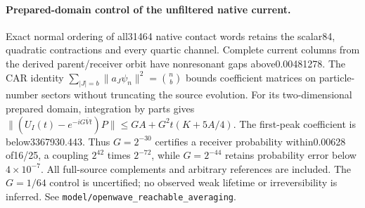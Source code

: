 \paragraph{Prepared-domain control of the unfiltered native current.}
Exact normal ordering of all31464 native contact words retains the scalar84,
quadratic contractions and every quartic channel. Complete current columns
from the derived parent/receiver orbit have nonresonant gaps above0.00481278.
The CAR identity
$\sum_{|J|=b}\|a_J\psi_n\|^2=\binom nb$ bounds coefficient matrices on
particle-number sectors without truncating the source evolution.
For its two-dimensional prepared domain, integration by parts gives
$\|(U_I(t)-e^{-iG\overline Vt})P\|\leq GA+G^2t(K+5A/4)$.
The first-peak coefficient is below3367930.443. Thus $G=2^{-30}$ certifies
a receiver probability within0.00628 of16/25, a coupling $2^{42}$ times
$2^{-72}$, while $G=2^{-44}$ retains probability error below$4\times10^{-7}$.
All full-source complements and arbitrary references are included. The
$G=1/64$ control is uncertified; no observed weak lifetime or irreversibility
is inferred. See \texttt{model/openwave\_reachable\_averaging}.
